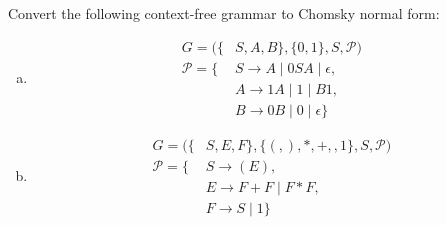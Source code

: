 \documentclass[a4paper,12pt]{amsart}
\begin{document}
\medskip\begin{problem}

    Convert the following context-free grammar to Chomsky normal form:
    \begin{multicols}{2}
        \begin{enumerate}[(a)]
    
            \item 
            \begin{align*}
            G=(\{&S,A,B\},\{0,1\},S,\mathcal P)\\
            \mathcal P=\{&S\rightarrow A\mid 0SA\mid \epsilon, \\
            &A\rightarrow 1A\mid 1\mid B1,\\
            &B\rightarrow 0B\mid 0\mid \epsilon\} 
            \end{align*}
    
            \item 
            \begin{align*}
            G=(\{&S,E,F\},\{(,),*,+,,1\},S,\mathcal P)\\
            \mathcal P=\{&
            S\rightarrow (E), \\
            &E\rightarrow F+F\mid F*F,\\
            &F\rightarrow S\mid 1\}
            \end{align*}

        \end{enumerate}
    \end{multicols}
        
\end{problem}
\end{document}
